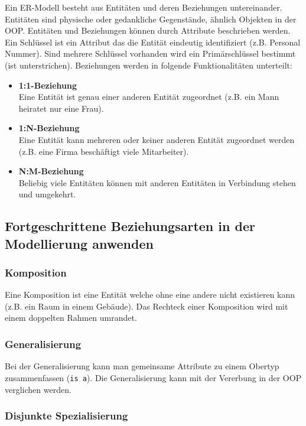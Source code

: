 Ein ER-Modell besteht aus Entitäten und deren Beziehungen untereinander. Entitäten sind physische oder gedankliche Gegenstände, ähnlich Objekten in der OOP. Entitäten und Beziehungen können durch Attribute beschrieben werden. Ein Schlüssel ist ein Attribut das die Entität eindeutig identifiziert (z.B. Personal Nummer). Sind mehrere Schlüssel vorhanden wird ein Primärschlüssel bestimmt (ist unterstrichen). Beziehungen werden in folgende Funktionalitäten unterteilt:

\begin{itemize}
	\item \textbf{1:1-Beziehung} \\
		  Eine Entität ist genau einer anderen Entität zugeordnet (z.B. ein Mann heiratet nur eine Frau). 
	\item \textbf{1:N-Beziehung} \\
		  Eine Entität kann mehreren oder keiner anderen Entität zugeordnet werden (z.B. eine Firma beschäftigt viele Mitarbeiter).
	\item \textbf{N:M-Beziehung} \\
		  Beliebig viele Entitäten können mit anderen Entitäten in Verbindung stehen und umgekehrt.
\end{itemize}

\subsection{Fortgeschrittene Beziehungsarten in der Modellierung anwenden}

\subsubsection{Komposition}

Eine Komposition ist eine Entität welche ohne eine andere nicht existieren kann (z.B. ein Raum in einem Gebäude). Das Rechteck einer Komposition wird mit einem doppelten Rahmen umrandet. 

\subsubsection{Generalisierung}

Bei der Generalisierung kann man gemeinsame Attribute zu einem Obertyp zusammenfassen (\texttt{is a}). Die Generalisierung kann mit der Vererbung in der OOP verglichen werden.

\subsubsection{Disjunkte Spezialisierung}

